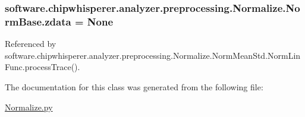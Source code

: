 \subsubsection[{zdata}]{\setlength{\rightskip}{0pt plus 5cm}software.\+chipwhisperer.\+analyzer.\+preprocessing.\+Normalize.\+Norm\+Base.\+zdata = None\hspace{0.3cm}{\ttfamily [static]}}\label{classsoftware_1_1chipwhisperer_1_1analyzer_1_1preprocessing_1_1Normalize_1_1NormBase_aea1a934b880f98f579b0199463978e59}


Referenced by software.\+chipwhisperer.\+analyzer.\+preprocessing.\+Normalize.\+Norm\+Mean\+Std.\+Norm\+Lin\+Func.\+process\+Trace().



The documentation for this class was generated from the following file\+:\begin{DoxyCompactItemize}
\item 
\hyperlink{Normalize_8py}{Normalize.\+py}\end{DoxyCompactItemize}
